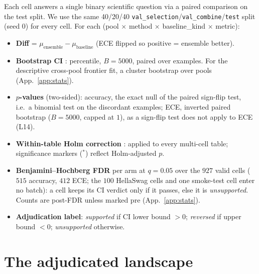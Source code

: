 \documentclass[11pt]{article}
\begin{document}
Each cell answers a single binary scientific question via a paired comparison on the test split. We use the same 40/20/40 \texttt{val\_selection}/\texttt{val\_combine}/\texttt{test} split (seed 0) for every cell. For each (pool $\times$ method $\times$ baseline\_kind $\times$ metric):
\begin{itemize}[leftmargin=*]
\item \textbf{Diff} = $\mu_{\text{ensemble}} - \mu_{\text{baseline}}$ (ECE flipped so positive = ensemble better).
\item \textbf{Bootstrap CI} \citep{efron1979bootstrap}: percentile, $B{=}5000$, paired over examples. For the descriptive cross-pool frontier fit, a cluster bootstrap over pools (App.~\ref{app:stats}).
\item \textbf{$p$-values} (two-sided): accuracy, the exact null of the paired sign-flip test, i.e.\ a binomial test on the discordant examples; ECE, inverted paired bootstrap ($B{=}5000$, capped at $1$), as a sign-flip test does not apply to ECE (L14).
\item \textbf{Within-table Holm correction} \citep{holm1979simple}: applied to every multi-cell table; significance markers ($^{*}$) reflect Holm-adjusted $p$.
\item \textbf{Benjamini--Hochberg FDR} \citep{bh1995} per arm at $q{=}0.05$ over the $927$ valid cells ($515$ accuracy, $412$ ECE; the $100$ HellaSwag cells and one smoke-test cell enter no batch): a cell keeps its CI verdict only if it passes, else it is \emph{unsupported}. Counts are post-FDR unless marked pre (App.~\ref{app:stats}).
\item \textbf{Adjudication label}: \emph{supported} if CI lower bound $> 0$; \emph{reversed} if upper bound $< 0$; \emph{unsupported} otherwise.
\end{itemize}

\section{The adjudicated landscape}
\label{sec:findings}
\end{document}
